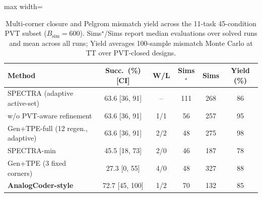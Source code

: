 \begin{table}[t]
\centering
\caption{Multi-corner closure and Pelgrom mismatch yield across the 11-task 45-condition PVT subset ($B_{\text{sim}}=600$). Sims$^\star$/Sims report median evaluations over solved runs and mean across all runs; Yield averages 100-sample mismatch Monte Carlo at TT over PVT-closed designs.}
\label{tab:pvt}
\scriptsize
\setlength{\tabcolsep}{2.2pt}
\begin{adjustbox}{max width=\columnwidth}
\begin{tabular}{@{}lccccc@{}}
\toprule
Method & Succ.\ (\%) [CI] & W/L & Sims$^\star$ & Sims & Yield (\%) \\
\midrule
SPECTRA (adaptive active-set) & 63.6 [36, 91] & -- & 111 & 268 & 86 \\
\quad w/o PVT-aware refinement & 63.6 [36, 91] & 1/1 & 56 & 257 & 95 \\
Gen+TPE-full (12 regen., adaptive) & 63.6 [36, 91] & 2/2 & 48 & 275 & 98 \\
SPECTRA-min & 45.5 [18, 73] & 2/0 & 46 & 187 & 78 \\
Gen+TPE (3 fixed corners)~\cite{lai2026analogcoderpro} & 27.3 [0, 55] & 4/0 & 48 & 327 & 88 \\
\textbf{AnalogCoder-style~\cite{lai2025analogcoder}} & 72.7 [45, 100] & 1/2 & 70 & 132 & 85 \\
\bottomrule
\end{tabular}
\end{adjustbox}
\end{table}
